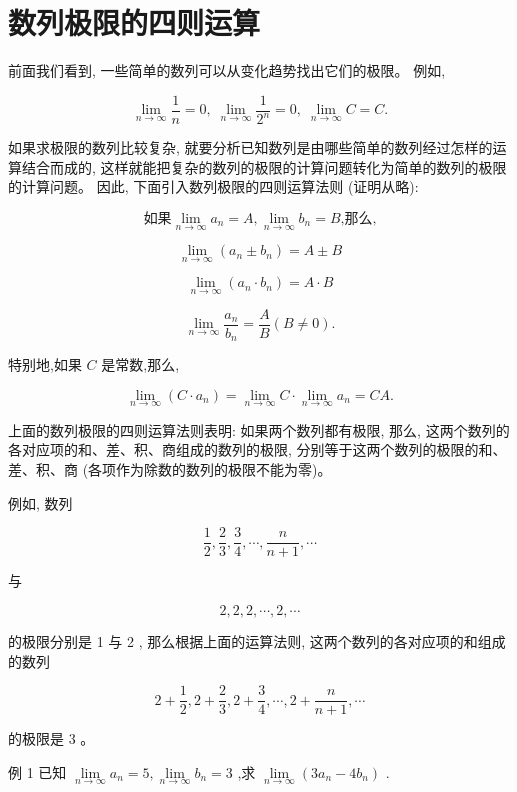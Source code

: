 \documentclass[lang=cn,newtx,12pt,scheme=chinese]{elegantbook}
\begin{document}
\section{数列极限的四则运算}
前面我们看到, 一些简单的数列可以从变化趋势找出它们的极限。 例如,

\[
\mathop{\lim }\limits_{{n \rightarrow \infty }}\frac{1}{n} = 0,\;\mathop{\lim }\limits_{{n \rightarrow \infty }}\frac{1}{{2}^{n}} = 0,\;\mathop{\lim }\limits_{{n \rightarrow \infty }}C = C.
\]

如果求极限的数列比较复杂, 就要分析已知数列是由哪些简单的数列经过怎样的运算结合而成的, 这样就能把复杂的数列的极限的计算问题转化为简单的数列的极限的计算问题。 因此, 下面引入数列极限的四则运算法则 (证明从略):

\[
\text{如果}\mathop{\lim }\limits_{{n \rightarrow \infty }}{a}_{n} = A,\mathop{\lim }\limits_{{n \rightarrow \infty }}{b}_{n} = B\text{,那么,}
\]

\[
\mathop{\lim }\limits_{{n \rightarrow \infty }}\left( {{a}_{n} \pm {b}_{n}}\right) = A \pm B
\]

\[
\mathop{\lim }\limits_{{n \rightarrow \infty }}\left( {{a}_{n} \cdot {b}_{n}}\right) = A \cdot B
\]

\[
\mathop{\lim }\limits_{{n \rightarrow \infty }}\frac{{a}_{n}}{{b}_{n}} = \frac{A}{B}\left( {B \neq 0}\right) .
\]

特别地,如果 \(C\) 是常数,那么,

\[
\mathop{\lim }\limits_{{n \rightarrow \infty }}\left( {C \cdot {a}_{n}}\right) = \mathop{\lim }\limits_{{n \rightarrow \infty }}C \cdot \mathop{\lim }\limits_{{n \rightarrow \infty }}{a}_{n} = {CA}.
\]

上面的数列极限的四则运算法则表明: 如果两个数列都有极限, 那么, 这两个数列的各对应项的和、差、积、商组成的数列的极限, 分别等于这两个数列的极限的和、差、积、商 (各项作为除数的数列的极限不能为零)。

例如, 数列

\[
\frac{1}{2},\frac{2}{3},\frac{3}{4},\cdots ,\frac{n}{n + 1},\cdots
\]

与

\[
2,2,2,\cdots ,2,\cdots
\]

的极限分别是 1 与 2 , 那么根据上面的运算法则, 这两个数列的各对应项的和组成的数列

\[
2 + \frac{1}{2},2 + \frac{2}{3},2 + \frac{3}{4},\cdots ,2 + \frac{n}{n + 1},\cdots
\]

的极限是 3 。

例 1 已知 \(\mathop{\lim }\limits_{{n \rightarrow \infty }}{a}_{n} = 5,\mathop{\lim }\limits_{{n \rightarrow \infty }}{b}_{n} = 3\) ,求 \(\mathop{\lim }\limits_{{n \rightarrow \infty }}\left( {3{a}_{n} - 4{b}_{n}}\right)\) .
\end{document}
